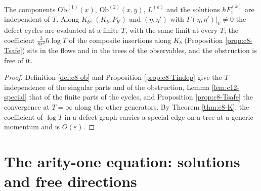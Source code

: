 \begin{proposition}[Endpoint]
\label{prop:c12-T}
The components $\mathrm{Ob}^{(1)}(x)$, $\mathrm{Ob}^{(2)}(x,y)$, $L^{(k)}$ and the solutions $\hbar F_1^{(k)}$ are independent of $T$. Along $K_b$, $(K_b,P_{b'})$ and $(\eta,\eta')$ with $\Gamma(\eta,\eta')|_V\neq0$ the defect cycles are evaluated at a finite $T$, with the same limit at every $T$; the coefficient $\tfrac3{8\pi^2}\hbar\log T$ of the composite insertions along $K_b$ (Proposition \ref{prop:c8-Tsafe}) sits in the flows and in the trees of the observables, and the obstruction is free of it.
\end{proposition}

\begin{proof}
Definition \ref{def:c8-ob} and Proposition \ref{prop:c8-Tindep} give the $T$-independence of the singular parts and of the obstruction, Lemma \ref{lem:c12-special} that of the finite parts of the cycles, and Proposition \ref{prop:c8-Tsafe} the convergence at $T=\infty$ along the other generators. By Theorem \ref{thm:c8-K}, the coefficient of $\log T$ in a defect graph carries a special edge on a tree at a generic momentum and is $O(\varepsilon)$.
\end{proof}

\section{The arity-one equation: solutions and free directions}

